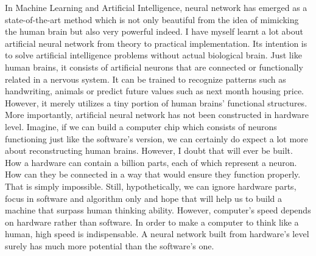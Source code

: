 \documentclass[11pt]{article}
\begin{document}
In Machine Learning and Artificial Intelligence, neural network has emerged as a state-of-the-art method which is not only beautiful from the idea of mimicking the human brain but also very powerful indeed. I have myself learnt a lot about artificial neural network from theory to practical implementation. Its intention is to solve artificial intelligence problems without actual biological brain. Just like human brains, it consists of artificial neurons that are connected or functionally related in a nervous system. It can be trained to recognize patterns such as handwriting, animals or predict future values such as next month housing price. However, it merely utilizes a tiny portion of human brains' functional structures. More importantly, artificial neural network has not been constructed in hardware level. Imagine, if we can build a computer chip which consists of neurons functioning just like the software's version, we can certainly do expect a lot more about reconstructing human brains. However, I doubt that will ever be built. How a hardware can contain a billion parts, each of which represent a neuron. How can they be connected in a way that would ensure they function properly. That is simply impossible. Still, hypothetically, we can ignore hardware parts, focus in software and algorithm only and hope that will help us to build a machine that surpass human thinking ability. However, computer's speed depends on hardware rather than software. In order to make a computer to think like a human, high speed is indispensable. A neural network built from hardware's level surely has much more potential than the software's one.  \\
\end{document}
